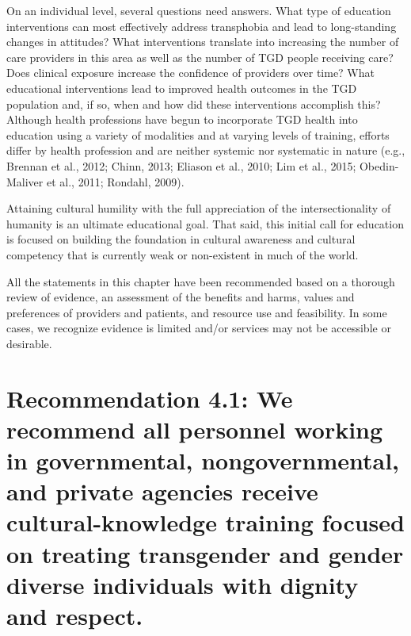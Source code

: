 \documentclass[
]{book}
\begin{document}
On an individual level, several questions need
answers. What type of education interventions
can most effectively address transphobia and
lead to long-standing changes in attitudes? What
interventions translate into increasing the number of care providers in this area as well as the
number of TGD people receiving care? Does
clinical exposure increase the confidence of providers over time? What educational interventions
lead to improved health outcomes in the TGD
population and, if so, when and how did these
interventions accomplish this? Although health
professions have begun to incorporate TGD
health into education using a variety of modalities and at varying levels of training, efforts
differ by health profession and are neither systemic nor systematic in nature (e.g., Brennan
et al., 2012; Chinn, 2013; Eliason et al., 2010;
Lim et al., 2015; Obedin-Maliver et al., 2011;
Rondahl, 2009).

Attaining cultural humility with the full appreciation of the intersectionality of humanity is an
ultimate educational goal. That said, this initial
call for education is focused on building the
foundation in cultural awareness and cultural
competency that is currently weak or non-existent
in much of the world.

All the statements in this chapter have been
recommended based on a thorough review of
evidence, an assessment of the benefits and
harms, values and preferences of providers and
patients, and resource use and feasibility. In
some cases, we recognize evidence is limited
and/or services may not be accessible or
desirable.

\hypertarget{recommendation-4.1-we-recommend-all-personnel-working-in-governmental-nongovernmental-and-private-agencies-receive-cultural-knowledge-training-focused-on-treating-transgender-and-gender-diverse-individuals-with-dignity-and-respect.}{%
\section*{Recommendation 4.1: We recommend all personnel working in governmental, nongovernmental, and private agencies receive cultural-knowledge training focused on treating transgender and gender diverse individuals with dignity and respect.}\label{recommendation-4.1-we-recommend-all-personnel-working-in-governmental-nongovernmental-and-private-agencies-receive-cultural-knowledge-training-focused-on-treating-transgender-and-gender-diverse-individuals-with-dignity-and-respect.}}
\end{document}
